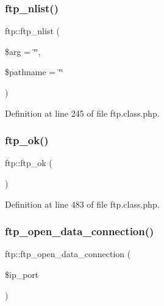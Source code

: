 \hypertarget{classftp_a1075a24d95dc5bcfe3886ffcbd606506}{}\label{classftp_a1075a24d95dc5bcfe3886ffcbd606506} 
\subsubsection{\texorpdfstring{ftp\+\_\+nlist()}{ftp\_nlist()}}
{\footnotesize\ttfamily ftp\+::ftp\+\_\+nlist (\begin{DoxyParamCaption}\item[{}]{\$arg = {\ttfamily \char`\"{}\char`\"{}},  }\item[{}]{\$pathname = {\ttfamily \char`\"{}\char`\"{}} }\end{DoxyParamCaption})}



Definition at line 245 of file ftp.\+class.\+php.

\hypertarget{classftp_a91d52ff0c56f9374cbaeae48cb54f604}{}\label{classftp_a91d52ff0c56f9374cbaeae48cb54f604} 
\subsubsection{\texorpdfstring{ftp\+\_\+ok()}{ftp\_ok()}}
{\footnotesize\ttfamily ftp\+::ftp\+\_\+ok (\begin{DoxyParamCaption}{ }\end{DoxyParamCaption})}



Definition at line 483 of file ftp.\+class.\+php.

\hypertarget{classftp_a493907034238b378487fba4c25af0509}{}\label{classftp_a493907034238b378487fba4c25af0509} 
\subsubsection{\texorpdfstring{ftp\+\_\+open\+\_\+data\+\_\+connection()}{ftp\_open\_data\_connection()}}
{\footnotesize\ttfamily ftp\+::ftp\+\_\+open\+\_\+data\+\_\+connection (\begin{DoxyParamCaption}\item[{}]{\$ip\+\_\+port }\end{DoxyParamCaption})}



